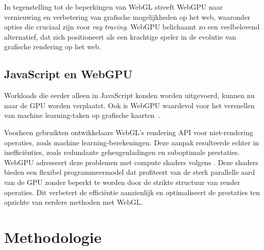 \bigbreak{}
In tegenstelling tot de beperkingen van WebGL streeft WebGPU naar vernieuwing en verbetering van grafische mogelijkheden op het web, waaronder opties die cruciaal zijn voor \textit{ray tracing}. WebGPU belichaamt zo een veelbelovend alternatief, dat zich positioneert als een krachtige speler in de evolutie van grafische rendering op het web.

\subsection{JavaScript en WebGPU}

Workloads die eerder alleen in JavaScript konden worden uitgevoerd, kunnen nu naar de GPU worden verplaatst. Ook is WebGPU waardevol voor het versnellen van machine learning-taken op grafische kaarten~\autocite{Wallez2023}.

\bigbreak{}
Voorheen gebruikten ontwikkelaars WebGL's rendering API voor niet-\-ren\-de\-ring operaties, zoals machine learning-be\-re\-ke\-ning\-en. Deze aanpak resulteerde echter in inefficiënties, zoals redundante geheugenladingen en suboptimale prestaties. WebGPU adresseert deze problemen met compute shaders volgens \textcite{Beaufort2023}. Deze shaders bieden een flexibel programmeermodel dat profiteert van de sterk parallelle aard van de GPU zonder beperkt te worden door de strikte structuur van render operaties.  Dit verbetert de efficiëntie aanzienlijk en optimaliseert de prestaties ten  opzichte van eerdere methoden met WebGL.

\newpage


\section{Methodologie}%
\label{sec:methodologie}




